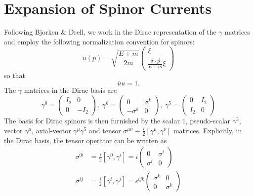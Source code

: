 \documentclass{book}[letterpaper,12pt]
\begin{document}
\chapter{Expansion of Spinor Currents}
\thispagestyle{headings}
Following Bjorken \& Drell, we work in the Dirac representation of the $\gamma$ matrices and employ the following normalization convention for spinors:
\begin{equation}
u(p)=\sqrt{\frac{E+m}{2m}}\left(\begin{array}{c}
\xi\\
\frac{\vec{\sigma}\cdot\vec{p}}{E+m}\xi
\end{array}\right)
\end{equation}
so that
\begin{equation}
\bar{u}u=1.
\end{equation}
The $\gamma$ matrices in the Dirac basis are
\begin{equation}
\gamma^0=\left(\begin{array}{cc}
I_2 & 0 \\
0 & -I_2
\end{array}\right),\;\gamma^k=\left(\begin{array}{cc}
0 & \sigma^k\\
-\sigma^k & 0
\end{array}\right),\;\gamma^5=\left(\begin{array}{cc}
0 & I_2\\
I_2 & 0
\end{array}\right)
\end{equation}
The basis for Dirac spinors is then furnished by the scalar $1$, pseudo-scalar $\gamma^5$, vector $\gamma^{\mu}$, axial-vector $\gamma^{\mu}\gamma^5$ and tensor $\sigma^{\mu\nu}\equiv \frac{i}{2}\left[\gamma^{\mu},\gamma^{\nu}\right]$ matrices. Explicitly, in the Dirac basis, the tensor operator can be written as
\begin{equation}
\begin{split}
\sigma^{0i}&=\frac{i}{2}\left[\gamma^0,\gamma^i\right]=i\left(\begin{array}{cc}
0 & \sigma^i\\
\sigma^i & 0
\end{array}\right)\\
\sigma^{ij}&=\frac{i}{2}\left[\gamma^i,\gamma^j\right]=\epsilon^{ijk}\left(\begin{array}{cc}
\sigma^k & 0\\
0 & \sigma^k
\end{array}\right)
\end{split}
\end{equation}
\end{document}
